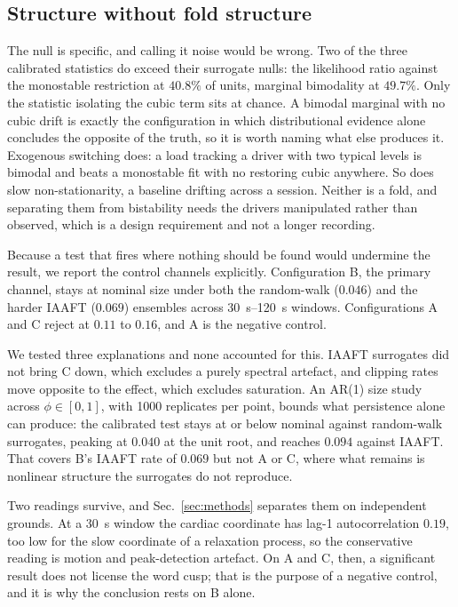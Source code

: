 \documentclass[conference]{IEEEtran}
\begin{document}
\subsection{Structure without fold structure}
The null is specific, and calling it noise would be wrong. Two of the three
calibrated statistics do exceed their surrogate nulls: the likelihood ratio
against the monostable restriction at $40.8\%$ of units, marginal bimodality at
$49.7\%$. Only the statistic isolating the cubic term sits at chance. A bimodal marginal with no cubic drift is exactly the configuration in which
distributional evidence alone concludes the opposite of the truth, so it is
worth naming what else produces it. Exogenous switching does: a load tracking a
driver with two typical levels is bimodal and beats a monostable fit with no
restoring cubic anywhere. So does slow non-stationarity, a baseline drifting
across a session. Neither is a fold, and separating them from bistability needs the drivers manipulated rather than
observed, which is a design requirement and not a longer recording.

Because a test that fires where nothing should be found would undermine the
result, we report the control channels explicitly. Configuration B, the
primary channel, stays at nominal size under both the random-walk ($0.046$) and the harder
IAAFT ($0.069$) ensembles across \SIrange{30}{120}{\second} windows.
Configurations A and C reject at $0.11$ to $0.16$, and A is the negative
control.

We tested three explanations and none accounted for this. IAAFT surrogates did
not bring C down, which excludes a purely spectral artefact, and clipping rates
move opposite to the effect, which excludes saturation. An AR(1) size study
across $\phi\in[0,1]$, with 1000 replicates per point, bounds what persistence
alone can produce: the calibrated test stays at or below nominal against
random-walk surrogates, peaking at $0.040$ at the unit root, and reaches
$0.094$ against IAAFT. That covers B's IAAFT rate of $0.069$ but not A or C,
where what remains is nonlinear structure the surrogates do not reproduce.

Two readings survive, and Sec.~\ref{sec:methods} separates them on independent
grounds. At a \SI{30}{\second} window the cardiac coordinate has lag-1
autocorrelation $0.19$, too low for the slow coordinate of a relaxation
process, so the conservative reading is motion and peak-detection artefact.
On A and C, then, a significant result does not license the word cusp; that
is the purpose of a negative control, and it is why the conclusion rests on B
alone.
\end{document}
